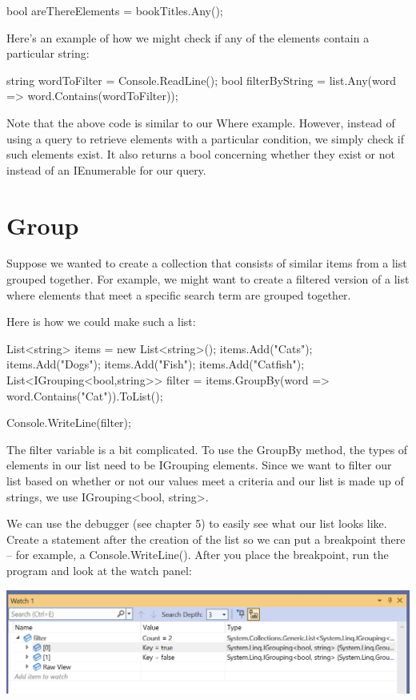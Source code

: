 \documentclass[oneside, openany] {book}
\begin{document}
\begin{CSharp}
bool areThereElements = bookTitles.Any();
\end{CSharp}

Here's an example of how we might check if any of the elements contain a particular string:

\begin{CSharp}
string wordToFilter = Console.ReadLine();
bool filterByString = list.Any(word => word.Contains(wordToFilter));
\end{CSharp}
Note that the above code is similar to our Where example. However, instead of using a query to retrieve elements with a particular condition, we simply check if such elements exist. It also returns a bool concerning whether they exist or not instead of an IEnumerable for our query.
\section{Group}
Suppose we wanted to create a collection that consists of similar items from a list grouped together. For example, we might want to create a filtered version of a list where elements that meet a specific search term are grouped together.

Here is how we could make such a list:

\begin{CSharp}
List<string> items = new List<string>();
items.Add("Cats");
items.Add("Dogs");
items.Add("Fish");
items.Add("Catfish");
List<IGrouping<bool,string>> filter =
items.GroupBy(word => word.Contains("Cat")).ToList();

Console.WriteLine(filter);
\end{CSharp}
The filter variable is a bit complicated. To use the GroupBy method, the types of elements in our list need to be IGrouping elements. Since we want to filter our list based on whether or not our values meet a criteria and our list is made up of strings, we use IGrouping<bool, string>.

We can use the debugger (see chapter 5) to easily see what our list looks like. Create a statement after the creation of the list so we can put a breakpoint there -- for example, a Console.WriteLine(). After you place the breakpoint, run the program and look at the watch panel:

\includegraphics[scale=0.33]{groupbydebugger1}
\end{document}

